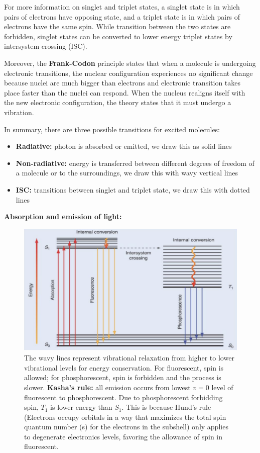 \documentclass[11pt,fleqn]{book}
\begin{document}
For more information on singlet and triplet states, a singlet state is in which pairs of electrons have opposing state, and a triplet state is in which pairs of electrons have the same spin. While transition between the two states are forbidden, singlet states can be converted to lower energy triplet states by intersystem crossing (ISC). 

Moreover, the \textbf{Frank-Codon} principle states that when a molecule is undergoing electronic transitions, the nuclear configuration experiences no significant change because nuclei are much bigger than electrons and electronic transition takes place faster than the nuclei can respond. When the nucleus realigns itself with the new electronic configuration, the theory states that it must undergo a vibration.

In summary, there are three possible transitions for excited molecules:
\begin{itemize}
	
\item \textbf{Radiative:} photon is absorbed or emitted, we draw this as solid lines
\item \textbf{Non-radiative: }energy is transferred between different degrees of freedom of a molecule or to the surroundings, we draw this with wavy vertical lines
\item \textbf{ISC: }transitions between singlet and triplet state, we draw this with dotted lines

\end{itemize}

\textbf{Absorption and emission of light: }
\begin{figure}[h!]
	\begin{center}
		\includegraphics[width=0.75\linewidth]{Pictures/p.png}
	\end{center}
	\caption{The wavy lines represent vibrational relaxation from higher to lower vibrational levels for energy conservation. For fluorescent, spin is allowed; for phosphorescent, spin is forbidden and the process is slower. \textbf{Kasha's rule: }all emission occurs from lowest $v=0$ level of fluorescent to phosphorescent. Due to phosphorescent forbidding spin, $T_1$ is lower energy than $S_1$. This is because Hund's rule (Electrons occupy orbitals in a way that maximizes the total spin quantum number (s) for the electrons in the subshell) only applies to degenerate electronics levels, favoring the allowance of spin in fluorescent.
	}
\end{figure}
\end{document}
